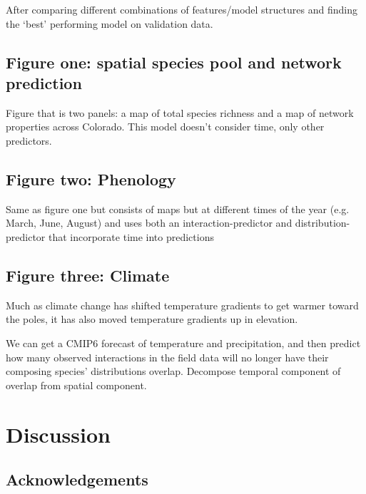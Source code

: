 \documentclass[10pt,oneside]{article}
\begin{document}
After comparing different combinations of features/model structures and
finding the `best' performing model on validation data.

\hypertarget{figure-one-spatial-species-pool-and-network-prediction}{%
\subsection{Figure one: spatial species pool and network
prediction}\label{figure-one-spatial-species-pool-and-network-prediction}}

Figure that is two panels: a map of total species richness and a map of
network properties across Colorado. This model doesn't consider time,
only other predictors.

\hypertarget{figure-two-phenology}{%
\subsection{Figure two: Phenology}\label{figure-two-phenology}}

Same as figure one but consists of maps but at different times of the
year (e.g. March, June, August) and uses both an interaction-predictor
and distribution-predictor that incorporate time into predictions

\hypertarget{figure-three-climate}{%
\subsection{Figure three: Climate}\label{figure-three-climate}}

Much as climate change has shifted temperature gradients to get warmer
toward the poles, it has also moved temperature gradients up in
elevation.

We can get a CMIP6 forecast of temperature and precipitation, and then
predict how many observed interactions in the field data will no longer
have their composing species' distributions overlap. Decompose temporal
component of overlap from spatial component.

\hypertarget{discussion}{%
\section{Discussion}\label{discussion}}

\hypertarget{acknowledgements}{%
\subsection{Acknowledgements}\label{acknowledgements}}
\end{document}
